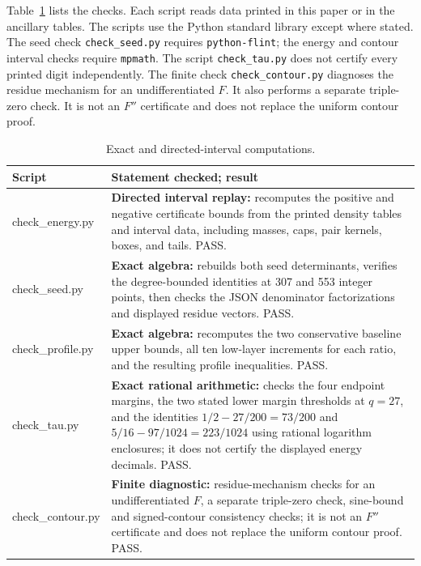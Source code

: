 \documentclass{amsart}
\theoremstyle{remark}
\numberwithin{equation}{section}
\numberwithin{table}{section}
\begin{document}
Table~\ref{tab:checks-clean} lists the checks. Each script reads data
printed in this paper or in the ancillary tables. The scripts use the Python
standard library except where stated. The seed check
\texttt{check\_seed.py} requires \texttt{python-flint}; the energy and
contour interval checks require \texttt{mpmath}.
The script \texttt{check\_tau.py} does not certify every printed digit
independently. The finite check \texttt{check\_contour.py} diagnoses the
residue mechanism for an undifferentiated $F$. It also performs a separate
triple-zero check. It is not an $F''$ certificate and does not replace the
uniform contour proof.

\begin{table}[!ht]
\caption{Exact and directed-interval computations.}\label{tab:checks-clean}
\small
\renewcommand{\arraystretch}{1.15}
\begin{tabular}{@{}>{\footnotesize\ttfamily}l>{\raggedright\arraybackslash}p{}@{}}
\normalfont\small Script & Statement checked; result\\ \hline
check\_energy.py & \textbf{Directed interval replay:} recomputes the positive and negative certificate bounds from the printed density tables and interval data, including masses, caps, pair kernels, boxes, and tails. PASS.\\
check\_seed.py & \textbf{Exact algebra:} rebuilds both seed determinants, verifies the degree-bounded identities at 307 and 553 integer points, then checks the JSON denominator factorizations and displayed residue vectors. PASS.\\
check\_profile.py & \textbf{Exact algebra:} recomputes the two conservative baseline upper bounds, all ten low-layer increments for each ratio, and the resulting profile inequalities. PASS.\\
check\_tau.py & \textbf{Exact rational arithmetic:} checks the four endpoint margins, the two stated lower margin thresholds at $q=27$, and the identities $1/2-27/200=73/200$ and $5/16-97/1024=223/1024$ using rational logarithm enclosures; it does not certify the displayed energy decimals. PASS.\\
check\_contour.py & \textbf{Finite diagnostic:} residue-mechanism checks for an undifferentiated $F$, a separate triple-zero check, sine-bound and signed-contour consistency checks; it is not an $F''$ certificate and does not replace the uniform contour proof. PASS.\\
\end{tabular}
\end{table}
\end{document}
